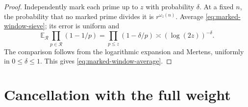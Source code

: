 \documentclass[11pt]{article}
\theoremstyle{definition}
\newcommand{\E}{\mathbb E}
\theoremstyle{remark}
\numberwithin{equation}{section}
\begin{document}
\begin{proof}
Independently mark each prime up to $z$ with probability $\delta$.
At a fixed $n$, the probability that no marked prime divides it is $r^{\omega_z(n)}$.
Average \eqref{eq:marked-window-sieve}; its error is uniform and
\begin{equation}\label{eq:marked-product-expectation}
 \E_{\mathcal R}\prod_{p\in\mathcal R}(1-1/p)
 =\prod_{p\le z}(1-\delta/p)\asymp(\log(2z))^{-\delta}.
\end{equation}
The comparison follows from the logarithmic expansion and Mertens, uniformly in $0\le\delta\le1$.
This gives \eqref{eq:marked-window-average}.
\end{proof}

\section{Cancellation with the full weight}\label{sec:full-proof}
\end{document}
